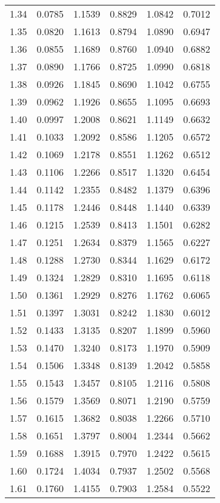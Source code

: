 \documentclass{article}
\begin{document}
\begin{longtable}{cccccc}
1.34 & 0.0785 & 1.1539 & 0.8829 & 1.0842 & 0.7012 \\
1.35 & 0.0820 & 1.1613 & 0.8794 & 1.0890 & 0.6947 \\
1.36 & 0.0855 & 1.1689 & 0.8760 & 1.0940 & 0.6882 \\
1.37 & 0.0890 & 1.1766 & 0.8725 & 1.0990 & 0.6818 \\
1.38 & 0.0926 & 1.1845 & 0.8690 & 1.1042 & 0.6755 \\
1.39 & 0.0962 & 1.1926 & 0.8655 & 1.1095 & 0.6693 \\
1.40 & 0.0997 & 1.2008 & 0.8621 & 1.1149 & 0.6632 \\
1.41 & 0.1033 & 1.2092 & 0.8586 & 1.1205 & 0.6572 \\
1.42 & 0.1069 & 1.2178 & 0.8551 & 1.1262 & 0.6512 \\
1.43 & 0.1106 & 1.2266 & 0.8517 & 1.1320 & 0.6454 \\
1.44 & 0.1142 & 1.2355 & 0.8482 & 1.1379 & 0.6396 \\
1.45 & 0.1178 & 1.2446 & 0.8448 & 1.1440 & 0.6339 \\
1.46 & 0.1215 & 1.2539 & 0.8413 & 1.1501 & 0.6282 \\
1.47 & 0.1251 & 1.2634 & 0.8379 & 1.1565 & 0.6227 \\
1.48 & 0.1288 & 1.2730 & 0.8344 & 1.1629 & 0.6172 \\
1.49 & 0.1324 & 1.2829 & 0.8310 & 1.1695 & 0.6118 \\
1.50 & 0.1361 & 1.2929 & 0.8276 & 1.1762 & 0.6065 \\
1.51 & 0.1397 & 1.3031 & 0.8242 & 1.1830 & 0.6012 \\
1.52 & 0.1433 & 1.3135 & 0.8207 & 1.1899 & 0.5960 \\
1.53 & 0.1470 & 1.3240 & 0.8173 & 1.1970 & 0.5909 \\
1.54 & 0.1506 & 1.3348 & 0.8139 & 1.2042 & 0.5858 \\
1.55 & 0.1543 & 1.3457 & 0.8105 & 1.2116 & 0.5808 \\
1.56 & 0.1579 & 1.3569 & 0.8071 & 1.2190 & 0.5759 \\
1.57 & 0.1615 & 1.3682 & 0.8038 & 1.2266 & 0.5710 \\
1.58 & 0.1651 & 1.3797 & 0.8004 & 1.2344 & 0.5662 \\
1.59 & 0.1688 & 1.3915 & 0.7970 & 1.2422 & 0.5615 \\
1.60 & 0.1724 & 1.4034 & 0.7937 & 1.2502 & 0.5568 \\
1.61 & 0.1760 & 1.4155 & 0.7903 & 1.2584 & 0.5522 \\

\end{longtable}
\end{document}
